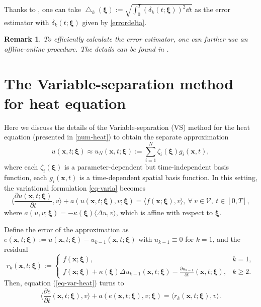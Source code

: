 \documentclass[10pt,a4paper]{article}
\newtheorem{remark}{Remark}
\numberwithin{equation}{section}
\numberwithin{lemma}{section}
\numberwithin{example}{section}
\numberwithin{definition}{section}
\numberwithin{assumption}{section}
\numberwithin{theorem}{section}
\numberwithin{proposition}{section}
\numberwithin{corollary}{section}
\numberwithin{remark}{section}
\begin{document}
Thanks to , one can take
$\bigtriangleup_k(\bm{\xi}):=\sqrt{\int_{0}^{T}(\delta_k(t;\bm{\xi}))^2\dd t}$ as the error estimator with $\delta_k(t;\bm{\xi})$ given by \eqref{errordelta}. 
 

\begin{remark}
To efficiently calculate the error estimator, one can further use an offline-online procedure. 
The details can be found in \cite{Friess2017DynamicalMR}.
\end{remark}




    \section{The Variable-separation method for heat equation}
    \label{sec-vs}
    Here we discuss the details of the Variable-separation (VS) method for the heat equation (presented in  \cref{num-heat}) to obtain the separate approximation
$$
u(\bm{x},t;\bm{\xi})\approx u_N(\bm{x},t;\bm{\xi}):=\sum_{i=1}^{N}\zeta_i(\bm{\xi})g_i(\bm{x},t),
$$
    where each $\zeta_i(\bm{\xi})$ is a parameter-dependent but time-independent basis function, each $g_i(\bm{x},t)$ is a time-dependent spatial basis function.
    In this setting, the variational formulation \eqref{eq-varia} becomes
    \begin{equation}
    \label{eq-var-heat}
     \Big\langle \frac{\partial u(\bm{x},t;\bm{\xi})}{\partial t},v\Big\rangle
        +a(u(\bm{x},t;\bm{\xi}),v;\bm{\xi})=\langle f(\bm{x};\bm{\xi}), v\rangle, ~\forall ~v\in \mathcal{V},~ t\in [0,T],
    \end{equation}
    where $a(u,v;\bm{\xi})=-\kappa(\bm{\xi})\langle \Delta u, v\rangle$, which is affine with respect to $\bm{\xi}$.
    
    Define the error of the approximation as ${e}(\bm{x},t;\bm{\xi}):={u}(\bm{x},t;\bm{\xi})-{u}_{k-1}(\bm{x},t;\bm{\xi})$ with $u_{k-1} \equiv 0$ for $k=1$, and the residual
$$
{r}_k(\bm{x},t;\bm{\xi}):=
\begin{cases}
f(\bm{x};\bm{\xi}),&k=1,\\
f(\bm{x};\bm{\xi}) + \kappa(\bm{\xi})\Delta u_{k-1}(\bm{x},t;\bm{\xi})-\frac{\partial u_{k-1}}{\partial t}(\bm{x},t;\bm{\xi}),&k\geq2.
\end{cases}
$$
Then, equation (\ref{eq-var-heat}) turns to
\begin{equation}
\label{eq-residual-2}
\Big \langle \frac{\partial e}{\partial t}(\bm{x},t;\bm{\xi}),v\Big\rangle+a(e(\bm{x},t;\bm{\xi}),v;\bm{\xi})=\langle{r}_k(\bm{x},t;\bm{\xi}),v\rangle.
\end{equation}
  
\end{document}
